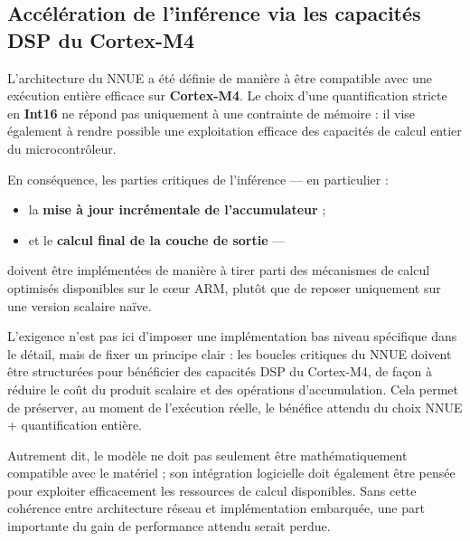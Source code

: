 \documentclass[11pt, a4paper]{article}
\begin{document}
\vspace{0.6em}
\subsection{Accélération de l'inférence via les capacités DSP du Cortex-M4}
\vspace{0.2em}

L'architecture du NNUE a été définie de manière à être compatible avec une exécution entière efficace sur \textbf{Cortex-M4}. Le choix d'une quantification stricte en \textbf{Int16} ne répond pas uniquement à une contrainte de mémoire : il vise également à rendre possible une exploitation efficace des capacités de calcul entier du microcontrôleur.

En conséquence, les parties critiques de l'inférence — en particulier :
\begin{itemize}
    \item la \textbf{mise à jour incrémentale de l'accumulateur} ;
    \item et le \textbf{calcul final de la couche de sortie} —
\end{itemize}
doivent être implémentées de manière à tirer parti des mécanismes de calcul optimisés disponibles sur le cœur ARM, plutôt que de reposer uniquement sur une version scalaire naïve.

L'exigence n'est pas ici d'imposer une implémentation bas niveau spécifique dans le détail, mais de fixer un principe clair : les boucles critiques du NNUE doivent être structurées pour bénéficier des capacités DSP du Cortex-M4, de façon à réduire le coût du produit scalaire et des opérations d'accumulation. Cela permet de préserver, au moment de l'exécution réelle, le bénéfice attendu du choix NNUE + quantification entière.

Autrement dit, le modèle ne doit pas seulement être mathématiquement compatible avec le matériel ; son intégration logicielle doit également être pensée pour exploiter efficacement les ressources de calcul disponibles. Sans cette cohérence entre architecture réseau et implémentation embarquée, une part importante du gain de performance attendu serait perdue.

\endgroup
\end{document}
